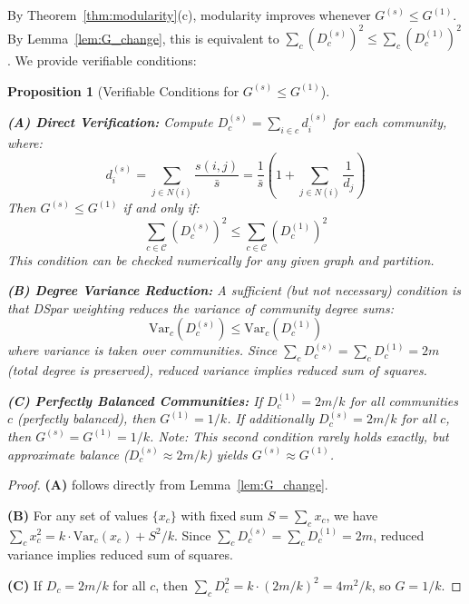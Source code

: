 \documentclass[10pt,journal,compsoc]{IEEEtran}
\newtheorem{proposition}{Proposition}
\begin{document}
By Theorem~\ref{thm:modularity}(c), modularity improves whenever $G^{(s)} \leq G^{(1)}$. By Lemma~\ref{lem:G_change}, this is equivalent to $\sum_c (D_c^{(s)})^2 \leq \sum_c (D_c^{(1)})^2$. We provide verifiable conditions:

\begin{proposition}[Verifiable Conditions for $G^{(s)} \leq G^{(1)}$]
\label{prop:alternatives}

\textbf{(A) Direct Verification:} Compute $D_c^{(s)} = \sum_{i \in c} d_i^{(s)}$ for each community, where:
\begin{equation}
d_i^{(s)} = \sum_{j \in N(i)} \frac{s(i,j)}{\bar{s}} = \frac{1}{\bar{s}}\left(1 + \sum_{j \in N(i)} \frac{1}{d_j}\right)
\end{equation}
Then $G^{(s)} \leq G^{(1)}$ if and only if:
\begin{equation}
\sum_{c \in \mathcal{C}} (D_c^{(s)})^2 \leq \sum_{c \in \mathcal{C}} (D_c^{(1)})^2
\end{equation}
This condition can be checked numerically for any given graph and partition.

\textbf{(B) Degree Variance Reduction:} A sufficient (but not necessary) condition is that DSpar weighting reduces the variance of community degree sums:
\begin{equation}
\text{Var}_c(D_c^{(s)}) \leq \text{Var}_c(D_c^{(1)})
\end{equation}
where variance is taken over communities. Since $\sum_c D_c^{(s)} = \sum_c D_c^{(1)} = 2m$ (total degree is preserved), reduced variance implies reduced sum of squares.

\textbf{(C) Perfectly Balanced Communities:} If $D_c^{(1)} = 2m/k$ for all communities $c$ (perfectly balanced), then $G^{(1)} = 1/k$. If additionally $D_c^{(s)} = 2m/k$ for all $c$, then $G^{(s)} = G^{(1)} = 1/k$. Note: This second condition rarely holds exactly, but approximate balance ($D_c^{(s)} \approx 2m/k$) yields $G^{(s)} \approx G^{(1)}$.
\end{proposition}

\begin{proof}
\textbf{(A)} follows directly from Lemma~\ref{lem:G_change}. 

\textbf{(B)} For any set of values $\{x_c\}$ with fixed sum $S = \sum_c x_c$, we have $\sum_c x_c^2 = k \cdot \text{Var}_c(x_c) + S^2/k$. Since $\sum_c D_c^{(s)} = \sum_c D_c^{(1)} = 2m$, reduced variance implies reduced sum of squares.

\textbf{(C)} If $D_c = 2m/k$ for all $c$, then $\sum_c D_c^2 = k \cdot (2m/k)^2 = 4m^2/k$, so $G = 1/k$.
\end{proof}
\end{document}
